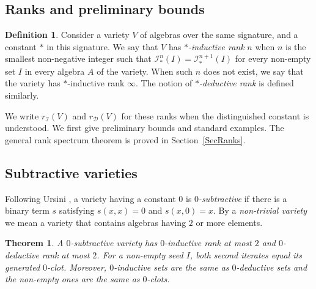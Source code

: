 \documentclass[12pt,english]{amsart}
\newtheorem{theorem}{Theorem}[section]
\theoremstyle{definition}
\newtheorem{definition}{Definition}[section]
\numberwithin{equation}{section}
\theoremstyle{remark}
\newcommand{\indn}[2]{\mathcal{I}^{#2}_\top(#1)}
\renewcommand{\top}{\ast}
\begin{document}
\smallskip

\subsection{Ranks and preliminary bounds}\label{SubsecRankPreliminaries}

\begin{definition}
Consider a variety $V$ of algebras over the same signature, and a constant $\top$ in this signature. We say that $V$ has \emph{$\top$-inductive rank} $n$ when $n$ is the smallest non-negative integer such that $\indn{I}{n}=\indn{I}{n+1}$ for every non-empty set $I$ in every algebra $A$ of the variety. When such $n$ does not exist, we say that the variety has $\top$-inductive rank $\infty$. The notion of \emph{$\top$-deductive rank} is defined similarly.
\end{definition}


We write $r_{\mathcal I}(V)$ and $r_{\mathcal D}(V)$ for these ranks when the distinguished constant is understood. We first give preliminary bounds and standard examples. The general rank spectrum theorem is proved in Section~\ref{SecRanks}.

\subsection{Subtractive varieties}\label{SubsecSubtractive}

Following Ursini \cite{Urs94}, a variety having a constant $0$ is \emph{$0$-subtractive} if there is a binary term $s$ satisfying $s(x,x)=0$ and $s(x,0)=x$.
By a \emph{non-trivial variety} we mean a variety that contains algebras having $2$ or more elements.

\begin{theorem}\label{ThmK}
A $0$-subtractive variety has $0$-inductive rank at most $2$ and $0$-deductive rank at most $2$. For a non-empty seed $I$, both second iterates equal its generated $0$-clot. Moreover, $0$-inductive sets are the same as $0$-deductive sets and the non-empty ones are the same as $0$-clots.
\end{theorem}
\end{document}
